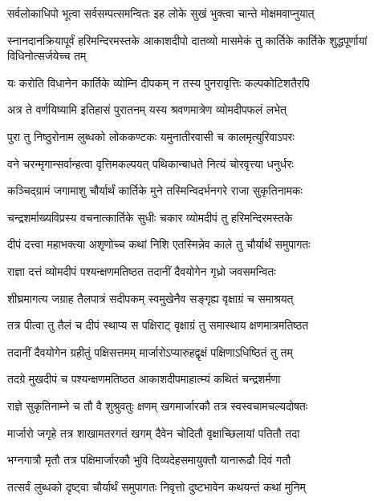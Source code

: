 \twolineshloka
{सर्वलोकाधिपो भूत्वा सर्वसम्पत्समन्वितः}
{इह लोके सुखं भुक्त्वा चान्ते मोक्षमवाप्नुयात्} %

\threelineshloka
{स्नानदानक्रियापूर्वं हरिमन्दिरमस्तके}
{आकाशदीपो दातव्यो मासमेकं तु कार्तिके}
{कार्तिके शुद्धपूर्णायां विधिनोत्सर्जयेच्च तम्} %

\twolineshloka
{यः करोति विधानेन कार्तिके व्योम्नि दीपकम्}
{न तस्य पुनरावृत्तिः कल्पकोटिशतैरपि} %

\twolineshloka
{अत्र ते वर्णयिष्यामि इतिहासं पुरातनम्}
{यस्य श्रवणमात्रेण व्योमदीपफलं लभेत्} %

\twolineshloka
{पुरा तु निष्ठुरोनाम लुब्धको लोककण्टकः}
{यमुनातीरवासी च कालमृत्युरिवाऽपरः} %

\twolineshloka
{वने चरन्मृगान्सर्वान्हत्वा वृत्तिमकल्पयत्}
{पथिकान्बाधते नित्यं चोरवृत्त्या धनुर्धरः} %

\twolineshloka
{कञ्चिद्ग्रामं जगामाशु चौर्यार्थं कार्तिके मुने}
{तस्मिन्विदर्भनगरे राजा सुकृतिनामकः} %

\twolineshloka
{चन्द्रशर्माख्यविप्रस्य वचनात्कार्तिके सुधीः}
{चकार व्योमदीपं तु हरिमन्दिरमस्तके} %

\twolineshloka
{दीपं दत्त्वा महाभक्त्या अशृणोच्च कथां निशि}
{एतस्मिन्नेव काले तु चौर्यार्थं समुपागतः} %

\twolineshloka
{राज्ञा दत्तं व्योमदीपं पश्यन्क्षणमतिष्ठत}
{तदानीं दैवयोगेन गृध्रो जवसमन्वितः} %

\twolineshloka
{शीघ्रमागत्य जग्राह तैलपात्रं सदीपकम्}
{स्वमुखेनैव सङ्गृह्य वृक्षाग्रं च समाश्रयत्} %

\twolineshloka
{तत्र पीत्वा तु तैलं च दीपं स्थाप्य स पक्षिराट्}
{वृक्षाग्रं तु समास्थाय क्षणमात्रमतिष्ठत} %

\twolineshloka
{तदानीं दैवयोगेन ग्रहीतुं पक्षिसत्तमम्}
{मार्जारोऽप्यारुहद्वृक्षं पक्षिणाऽधिष्ठितं तु तम्} %

\twolineshloka
{तदग्रे मुखदीपं च पश्यन्क्षणमतिष्ठत}
{आकाशदीपमाहात्म्यं कथितं चन्द्रशर्मणा} %

\twolineshloka
{राज्ञे सुकृतिनाम्ने च तौ वै शुश्रुवतुः क्षणम्}
{खगमार्जारकौ तत्र स्वस्वचामचल्यदोषतः} %

\twolineshloka
{मार्जारो जगृहे तत्र शाखामतरगतं खगम्}
{दैवेन चोदितौ वृक्षाच्छिलायां पतितौ तदा} %

\twolineshloka
{भग्नगात्रौ मृतौ तत्र पक्षिमार्जारकौ भुवि}
{दिव्यदेहसमायुक्तौ यानारूढौ दिवं गतौ} %

\twolineshloka
{तत्सर्वं लुब्धको दृष्ट्वा चौर्यार्थं समुपागतः}
{निवृत्तो दुष्टभावेन कथयन्तं कथां मुनिम्} %

